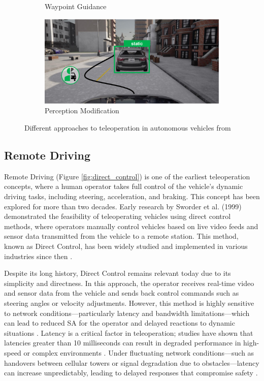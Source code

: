 \begin{figure}[h]
\begin{subfigure}[b]{0.48\textwidth}
        \caption{Waypoint Guidance}
        \label{fig:waypoint_guidance}
    \end{subfigure}
    \hfill
    \begin{subfigure}[b]{0.48\textwidth}
        \centering
        \includegraphics[width=\textwidth]{figures/percmod.png}
        \caption{Perception Modification}
        \label{fig:perception_modification}
    \end{subfigure}
    \caption{Different approaches to teleoperation in autonomous vehicles from \cite{Brecht}}
    \label{fig:teleoperation_concepts}
\end{figure}

\subsection{Remote Driving}
Remote Driving (Figure \ref{fig:direct_control}) is one of the earliest teleoperation concepts,
where a human operator takes full control of the vehicle's
dynamic driving tasks, including steering, acceleration,
and braking. This concept has been explored for more than two decades.
Early research by Sworder et al. \cite{sworder1999performance} (1999) demonstrated the feasibility
of teleoperating vehicles using direct control methods, where
operators manually control vehicles based on live video feeds and
sensor data transmitted from the vehicle to a remote station.
This method, known as Direct Control, has been widely studied
and implemented in various industries since then \cite{Gnatzig,chucholowski2014teleoperated,Tang}.

Despite its long history, Direct Control remains relevant
today due to its simplicity and directness. In this approach,
the operator receives real-time video and sensor data from the
vehicle and sends back control commands such as steering angles
or velocity adjustments. However, this method is highly sensitive
to network conditions—particularly latency and bandwidth
limitations—which can lead to reduced \ac{SA} for
the operator and delayed reactions to dynamic situations \cite{Gnatzig}.
Latency is a critical factor in teleoperation; studies have shown
that latencies greater than 10 milliseconds can result in degraded
performance in high-speed or complex environments \cite{chucholowski2014teleoperated}.
Under fluctuating network conditions—such as handovers
between cellular towers or signal degradation due to obstacles—latency
can increase unpredictably, leading to delayed responses that
compromise safety \cite{neumeier2023feasibility}.

